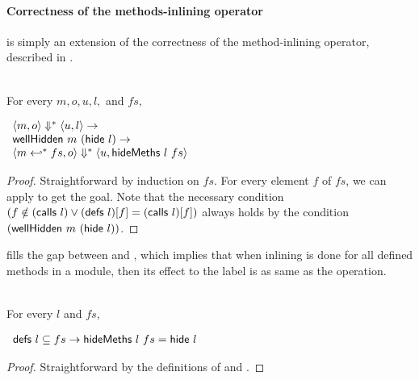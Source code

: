 \paragraph{Correctness of the methods-inlining operator}

 is simply an extension of the correctness
of the method-inlining operator, described in .

\begin{lemma}
  \label{lem-inlinedmssubo}
  \mbox{}\\
  For every $m, o, u, l,$ and $fs,$
  \begin{center}
    \begin{math}
      \begin{array}{l}
        \langle m, o \rangle \Downarrow^{\ast} \langle u, l \rangle \to \\
        \textsf{wellHidden}\ m\ (\textsf{hide}{}\ l) \to \\
        \langle m \hookleftarrow^{\ast}{} fs, o \rangle \Downarrow^{\ast} \langle u, \textsf{hideMeths}{}\ l\ fs \rangle
      \end{array}
    \end{math}
  \end{center}
\end{lemma}
\begin{proof}
  Straightforward by induction on $fs$. For every element $f$ of $fs$,
  we can apply  to get the goal. Note that the
  necessary condition $(f \notin (\textsf{calls}\ l) \vee (\textsf{defs}\ l)[f] =
  (\textsf{calls}\ l)[f])$ always holds by the condition
  $(\textsf{wellHidden}\ m\ (\textsf{hide}{}\ l))$.
\end{proof}

 fills the gap between \hidemethssym{} and
\hidesym{}, which implies that when inlining is done for all defined
methods in a module, then its effect to the label is as same as the
\hidesym{} operation.

\begin{lemma}
  \label{lem-hidemeths}
  \mbox{}\\
  For every $l$ and $fs$,
  \begin{center}
    \begin{math}
      \begin{array}{l}
        \textsf{defs}\ l \subseteq fs \to \textsf{hideMeths}{}\ l\ fs = \textsf{hide}{}\ l
      \end{array}
    \end{math}
  \end{center}
\end{lemma}
\begin{proof}
  Straightforward by the definitions of \hidemethssym{} and
  \hidesym{}.
\end{proof}

